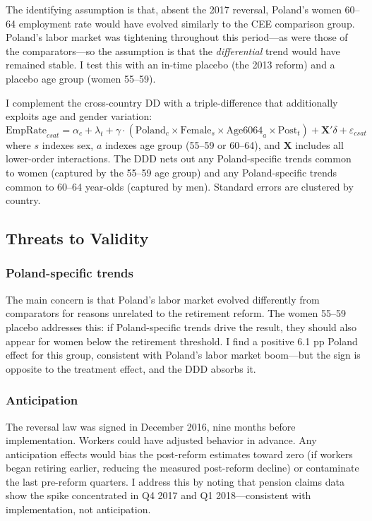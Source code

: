 \documentclass[12pt]{article}
\begin{document}
The identifying assumption is that, absent the 2017 reversal, Poland's women 60--64 employment rate would have evolved similarly to the CEE comparison group. Poland's labor market was tightening throughout this period---as were those of the comparators---so the assumption is that the \textit{differential} trend would have remained stable. I test this with an in-time placebo (the 2013 reform) and a placebo age group (women 55--59).

I complement the cross-country DD with a triple-difference that additionally exploits age and gender variation:
\begin{equation}
\text{EmpRate}_{csat} = \alpha_c + \lambda_t + \gamma \cdot (\text{Poland}_c \times \text{Female}_s \times \text{Age6064}_a \times \text{Post}_t) + \mathbf{X}'\delta + \varepsilon_{csat}
\label{eq:ddd}
\end{equation}
where $s$ indexes sex, $a$ indexes age group (55--59 or 60--64), and $\mathbf{X}$ includes all lower-order interactions. The DDD nets out any Poland-specific trends common to women (captured by the 55--59 age group) and any Poland-specific trends common to 60--64 year-olds (captured by men). Standard errors are clustered by country.

\subsection{Threats to Validity}

\subsubsection*{Poland-specific trends} The main concern is that Poland's labor market evolved differently from comparators for reasons unrelated to the retirement reform. The women 55--59 placebo addresses this: if Poland-specific trends drive the result, they should also appear for women below the retirement threshold. I find a positive 6.1 pp Poland effect for this group, consistent with Poland's labor market boom---but the sign is opposite to the treatment effect, and the DDD absorbs it.

\subsubsection*{Anticipation} The reversal law was signed in December 2016, nine months before implementation. Workers could have adjusted behavior in advance. Any anticipation effects would bias the post-reform estimates toward zero (if workers began retiring earlier, reducing the measured post-reform decline) or contaminate the last pre-reform quarters. I address this by noting that pension claims data show the spike concentrated in Q4 2017 and Q1 2018---consistent with implementation, not anticipation.
\end{document}
